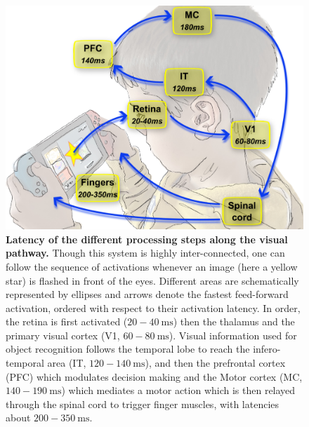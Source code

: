 \documentclass[brainsci, %
               review,submit,pdftex,moreauthors
               ]{Definitions/mdpi}
\newcommand{\ms}{\si{\milli\second}}%
\begin{document}
\begin{figure}
\centering
\includegraphics[width=.75\textwidth]{figures/visual-latency.pdf}
\caption{{\bf Latency of the different processing steps along the visual pathway.} Though this system is highly inter-connected, one can follow the sequence of activations whenever an image (here a yellow star) is flashed in front of the eyes. Different areas are schematically represented by ellipses and arrows denote the fastest feed-forward activation, ordered with respect to their activation latency. In order, the retina is first activated ($20-40~\ms$) then the thalamus and the primary visual cortex (V1, $60-80~\ms$). Visual information used for object recognition follows the temporal lobe to reach the infero-temporal area (IT, $120-140~\ms$), and then the prefrontal cortex (PFC) which modulates decision making and the Motor cortex (MC, $140-190~\ms$) which mediates a motor action which is then relayed through the spinal cord to trigger finger muscles, with latencies about $200-350~\ms$.}\label{fig:thorpe}
\end{figure}
\end{document}
